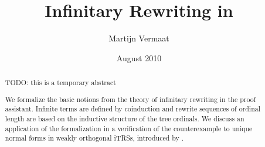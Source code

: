 \documentclass[color]{vu}
\title{Infinitary Rewriting in \Coq}
\author{Martijn Vermaat}
\date{August 2010}
\begin{document}
\makefrontmatter
\maketitle

\begin{abstract}
  TODO: this is a temporary abstract

  We formalize the basic notions from the theory of infinitary
  rewriting in the \Coq proof assistant. Infinite terms are defined by
  coinduction and rewrite sequences of ordinal length are based on the
  inductive structure of the tree ordinals. We discuss an
  application of the formalization in a verification of the
  counterexample to unique normal forms in weakly orthogonal iTRSs,
  introduced by \citet{endrullis-10}.
\end{abstract}



\tableofcontents







\appendix




\nocite{*}

\end{document}
